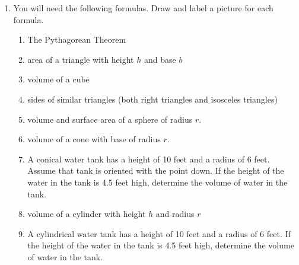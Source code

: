 \documentclass[11pt,fleqn]{article}
\begin{document}
 \begin{enumerate}
 \item You will need the following formulas. Draw and label a picture for each formula. 
 	\begin{enumerate}
	\item The Pythagorean Theorem
	\vfill
	\item area of a triangle with height $h$ and base $b$
	\vfill
	\item volume of a cube
	\vfill
	\item sides of similar triangles (both right triangles and isosceles triangles)
	\vfill
	\item volume and surface area of a sphere of radius $r.$
	\vfill
	\item volume of a cone with base of radius $r.$
	\vfill
	\item A conical water tank has a height of 10 feet and a radius of 6 feet. Assume that tank is oriented with the point down. If the height of the water in the tank is 4.5 feet high, determine the volume of water in the tank.
	\vfill
	 \item volume of a cylinder with height $h$ and radius $r$
	 \vfill
	 \item A cylindrical water tank has a height of 10 feet and a radius of 6 feet. If the height of the water in the tank is 4.5 feet high, determine the volume of water in the tank.
	 \vfill
	\end{enumerate}
\end{enumerate} 
 
\end{document}
